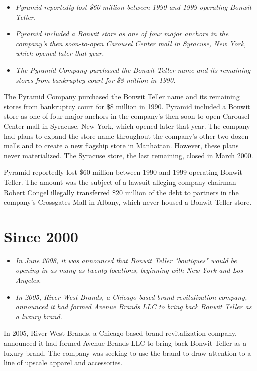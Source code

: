 \begin{itemize}
\item
  \emph{Pyramid reportedly lost \$60 million between 1990 and 1999
  operating Bonwit Teller.}
\item
  \emph{Pyramid included a Bonwit store as one of four major anchors in
  the company's then soon-to-open Carousel Center mall in Syracuse, New
  York, which opened later that year.}
\item
  \emph{The Pyramid Company purchased the Bonwit Teller name and its
  remaining stores from bankruptcy court for \$8 million in 1990.}
\end{itemize}

The Pyramid Company purchased the Bonwit Teller name and its remaining
stores from bankruptcy court for \$8 million in 1990. Pyramid included a
Bonwit store as one of four major anchors in the company's then
soon-to-open Carousel Center mall in Syracuse, New York, which opened
later that year. The company had plans to expand the store name
throughout the company's other two dozen malls and to create a new
flagship store in Manhattan. However, these plans never materialized.
The Syracuse store, the last remaining, closed in March 2000.

Pyramid reportedly lost \$60 million between 1990 and 1999 operating
Bonwit Teller. The amount was the subject of a lawsuit alleging company
chairman Robert Congel illegally transferred \$20 million of the debt to
partners in the company's Crossgates Mall in Albany, which never housed
a Bonwit Teller store.

\section{Since 2000}\label{since-2000}

\begin{itemize}
\item
  \emph{In June 2008, it was announced that Bonwit Teller "boutiques"
  would be opening in as many as twenty locations, beginning with New
  York and Los Angeles.}
\item
  \emph{In 2005, River West Brands, a Chicago-based brand revitalization
  company, announced it had formed Avenue Brands LLC to bring back
  Bonwit Teller as a luxury brand.}
\end{itemize}

In 2005, River West Brands, a Chicago-based brand revitalization
company, announced it had formed Avenue Brands LLC to bring back Bonwit
Teller as a luxury brand. The company was seeking to use the brand to
draw attention to a line of upscale apparel and accessories.

